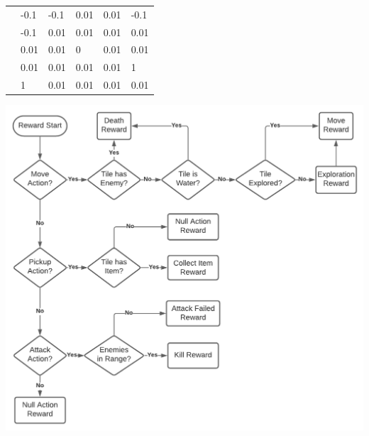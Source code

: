 \begin{flushleft}
            \begin{center}
                \begin{tabular}{m{0cm} C{1cm} C{1cm} C{1cm} C{1cm} C{1cm}}
                        \rule{0pt}{1.2cm}%
                        &-0.1 & -0.1 & 0.01 & 0.01 & -0.1 \\
                        \rule{0pt}{1.2cm}%
                        &-0.1 & 0.01 & 0.01 & 0.01 & 0.01 \\
                        \rule{0pt}{1.2cm}%
                        &0.01 & 0.01 & 0 & 0.01 & 0.01 \\
                        \rule{0pt}{1.2cm}%
                        &0.01 & 0.01 & 0.01 & 0.01 & 1 \\
                        \rule{0pt}{1.2cm}%
                        &1  & 0.01 & 0.01 & 0.01 & 0.01 \\
                \end{tabular}
                \vspace{0.5cm}
                \includegraphics[width=\textwidth]{Images/Design/RewardActionStructure.png}
            \end{center}   

\end{flushleft}

